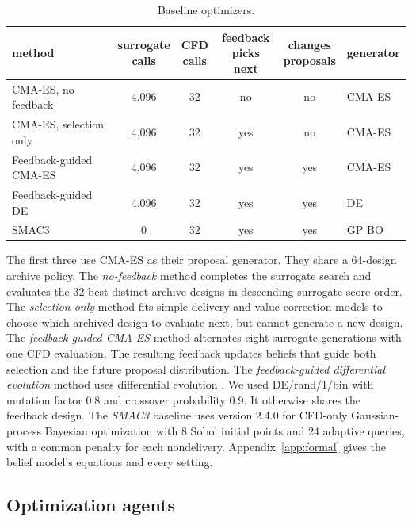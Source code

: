 \documentclass{article} %
\begin{document}
\begin{table}[htbp]
\caption{Baseline optimizers.}
\label{tab:baseline-methods}
\centering
\scriptsize
\setlength{\tabcolsep}{3.5pt}
\begin{tabular*}{\textwidth}{@{\extracolsep{\fill}}lccccl}
\toprule
method & \shortstack{surrogate\\calls} & \shortstack{CFD\\calls} & \shortstack{feedback\\picks next} & \shortstack{changes\\proposals} & generator \\
\midrule
CMA-ES, no feedback & 4{,}096 & 32 & no & no & CMA-ES \\
CMA-ES, selection only & 4{,}096 & 32 & yes & no & CMA-ES \\
Feedback-guided CMA-ES & 4{,}096 & 32 & yes & yes & CMA-ES \\
Feedback-guided DE & 4{,}096 & 32 & yes & yes & DE \\
SMAC3 & 0 & 32 & yes & yes & GP BO \\
\bottomrule
\end{tabular*}
\end{table}

The first three use CMA-ES \citep{hansen2001cmaes,hansen2016tutorial} as their
proposal generator. They share a 64-design archive policy. The \emph{no-feedback} method completes the surrogate search and evaluates the 32
best distinct archive designs in descending surrogate-score order.
The \emph{selection-only} method fits simple
delivery and value-correction models to choose which archived design to evaluate
next, but cannot generate a new design. The \emph{feedback-guided CMA-ES} method alternates
eight surrogate generations with one CFD evaluation. The resulting feedback
updates beliefs that guide both selection and the future proposal distribution.
The \emph{feedback-guided differential evolution} method uses differential
evolution \citep{storn1997differential}. We used DE/rand/1/bin with mutation
factor 0.8 and crossover probability 0.9. It otherwise shares the feedback
design. The \emph{SMAC3} baseline \citep{lindauer2022smac3} uses version
2.4.0 for CFD-only Gaussian-process Bayesian optimization with 8 Sobol initial
points and 24 adaptive queries, with a common penalty for each nondelivery.
Appendix~\ref{app:formal} gives the belief model's equations and every setting.


\subsection{Optimization agents}
\label{sec:agents}
\end{document}
